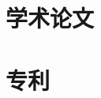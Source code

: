
\begin{resume}

	\section*{学术论文}

	\begin{achievements}
	\end{achievements}


	\section*{专利}

	\begin{achievements}
	\end{achievements}

\end{resume}
